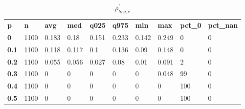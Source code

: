 \begin{table}[h]
 \centering 
\footnotesize
\caption{$\rho_{hcg,c}^\prime $}
\label{tab:alphahcgc}
\begin{tabular}[h]{| l l l l l l l l l l|
    } \hline
\textbf{ p} & \textbf{ n} & \textbf{ avg} & \textbf{ med} & \textbf{ q025} & \textbf{ q975} & \textbf{ min} & \textbf{ max} & \textbf{ pct\_0} & \textbf{ pct\_nan}
           \\
  \textbf{  0} & 1100 & 0.183 &  0.18 & 0.151 & 0.233 & 0.142 & 0.249 &   0 & 0
           \\
  \textbf{0.1} & 1100 & 0.118 & 0.117 &   0.1 & 0.136 &  0.09 & 0.148 &   0 & 0
           \\
  \textbf{0.2} & 1100 & 0.055 & 0.056 & 0.027 &  0.08 &  0.01 & 0.091 &   2 & 0
           \\
  \textbf{0.3} & 1100 &     0 &     0 &     0 &     0 &     0 & 0.048 &  99 & 0
           \\
  \textbf{0.4} & 1100 &     0 &     0 &     0 &     0 &     0 &     0 & 100 & 0
           \\
  \textbf{0.5} & 1100 &     0 &     0 &     0 &     0 &     0 &     0 & 100 & 0
           \\
 \hline \end{tabular}
 \end{table}
